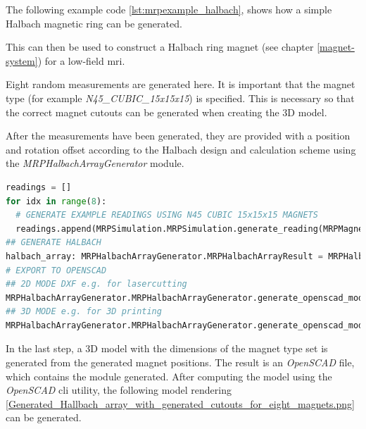 The following example code \ref{lst:mrpexample_halbach}, shows how a
simple Halbach magnetic ring can be generated.

This can then be used to construct a Halbach ring magnet (see chapter
\ref{magnet-system}) for a low-field \gls{mri}.

Eight random measurements are generated here. It is important that the
magnet type (for example \emph{N45\_CUBIC\_15x15x15}) is specified. This
is necessary so that the correct magnet cutouts can be generated when
creating the 3D model.

After the measurements have been generated, they are provided with a
position and rotation offset according to the Halbach design and
calculation scheme \cite{HallbachMagnetDesignPaper} using the
\emph{MRPHalbachArrayGenerator} module.

\begin{lstlisting}[language=Python, caption={MRPHalbachArrayGenerator example for generating an OpenSCAD based halbach ring}, label=lst:mrpexample_halbach]
readings = []
for idx in range(8):
  # GENERATE EXAMPLE READINGS USING N45 CUBIC 15x15x15 MAGNETS
  readings.append(MRPSimulation.MRPSimulation.generate_reading(MRPMagnetTypes.MagnetType.N45_CUBIC_15x15x15))
## GENERATE HALBACH
halbach_array: MRPHalbachArrayGenerator.MRPHalbachArrayResult = MRPHalbachArrayGenerator.MRPHalbachArrayGenerator.generate_1k_halbach_using_polarisation_direction(readings)
# EXPORT TO OPENSCAD
## 2D MODE DXF e.g. for lasercutting
MRPHalbachArrayGenerator.MRPHalbachArrayGenerator.generate_openscad_model([halbach_array], "./2d_test.scad",_2d_object_code=True)
## 3D MODE e.g. for 3D printing
MRPHalbachArrayGenerator.MRPHalbachArrayGenerator.generate_openscad_model([halbach_array], "./3d_test.scad",_2d_object_code=False)
\end{lstlisting}

In the last step, a 3D model with the dimensions of the magnet type set
is generated from the generated magnet positions. The result is an
\emph{OpenSCAD} \cite{OpenSCAD} file, which contains the module
generated. After computing the model using the \emph{OpenSCAD} \gls{cli}
utility, the following model rendering
\ref{Generated_Hallbach_array_with_generated_cutouts_for_eight_magnets.png}
can be generated.

